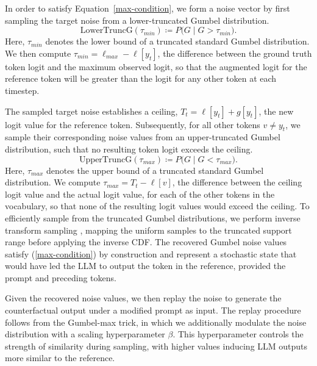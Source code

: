 \documentclass[letterpaper]{article} %
\begin{document}
In order to satisfy Equation~\ref{max-condition}, we form a noise vector by first sampling the target noise from a lower-truncated Gumbel distribution. 
$$
\mathrm{LowerTruncG}(\tau_{min}) \coloneqq P\bigl(G \mid G > \tau_{min}\bigr).
$$ 
Here, $\tau_{min}$ denotes the lower bound of a truncated standard Gumbel distribution. We then compute $\tau_{min} = \ell_{max} - \ell[{y_t}]$, the difference between the ground truth token logit and the maximum observed logit, so that the augmented logit for the reference token will be greater than the logit for any other token at each timestep.

% 


The sampled target noise establishes a ceiling, $T_{t} = \ell[{y_t}] + g[y_t]$, the new logit value for the reference token. Subsequently, for all other tokens $v \neq y_t$, we sample their corresponding noise values from an upper-truncated Gumbel distribution, such that no resulting token logit exceeds the ceiling. 
$$
\mathrm{UpperTruncG}(\tau_{max}) \coloneqq P\bigl(G \mid G < \tau_{max}\bigr).
$$ 
Here, $\tau_{max}$ denotes the upper bound of a truncated standard Gumbel distribution. We compute $\tau_{max} = T_t - \ell[v]$, the difference between the ceiling logit value and the actual logit value, for each of the other tokens in the vocabulary, so that none of the resulting logit values would exceed the ceiling. To efficiently sample from the truncated Gumbel distributions, we perform inverse transform sampling \cite{devroye1986non}, mapping the uniform samples to the truncated support range before applying the inverse CDF. The recovered Gumbel noise values satisfy (\ref{max-condition}) by construction and represent a stochastic state that would have led the LLM to output the token in the reference, provided the prompt and preceding tokens.

Given the recovered noise values, we then replay the noise to generate the counterfactual output under a modified prompt as input. The replay procedure follows from the Gumbel-max trick, in which we additionally modulate the noise distribution with a scaling hyperparameter $\beta$. This hyperparameter controls the strength of similarity during sampling, with higher values inducing LLM outputs more similar to the reference. 
\end{document}
